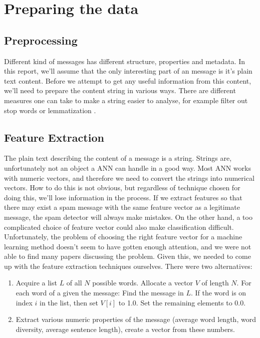
\section{Preparing the data}

\subsection{Preprocessing}

Different kind of messages has different structure, properties and
metadata. In this report, we'll assume that the only interesting part of an
message is it's plain text content. Before we attempt to get any useful
information from this content, we'll
need to prepare the content string in various ways. There are different
measures one can take to make a string easier to analyse, for example filter
out stop words \cite{stop-words} or lemmatization \cite{lemmatization}.


\subsection{Feature Extraction}

The plain text describing the content of a message is a string.  Strings are,
unfortunately not an object a ANN can handle in a good way. Most ANN works with
numeric vectors, and therefore we need to convert the strings into numerical
vectors. How to do this is not obvious, but regardless of technique chosen for
doing this, we'll lose information in the process. If we extract features so
that there may exist a spam message with the same feature vector as a
legitimate message, the spam detector will always make mistakes. On the other
hand, a too complicated choice of feature vector could also make classification
difficult. Unfortunately, the problem of choosing the right feature vector for
a machine learning method doesn't seem to have gotten enough attention, and we
were not able to find many papers discussing the problem. Given this, we needed
to come up with the feature extraction techniques ourselves. There were two
alternatives:
\begin{enumerate}
  \item Acquire a list $L$ of all $N$ possible words. Allocate a vector $V$
    of length $N$. For each word of a given the message: Find the message in
    $L$.  If the word is on index $i$ in the list, then set $V[i]$ to 1.0. Set
    the remaining elements to 0.0.
  \item Extract various numeric properties of the message (average word length,
    word diversity, average sentence length), create a vector from these
    numbers.
\end{enumerate}

